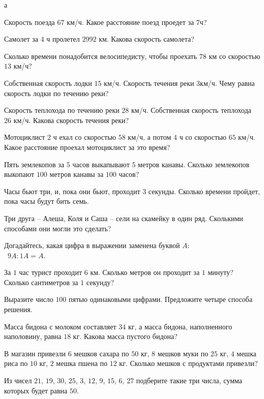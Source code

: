 \begin{exam}
	\begin{listofex}
		\item а
	\end{listofex}
\end{exam}

\begin{consultation}
	\begin{listofex}
		\item Скорость поезда \( 67 \) км/ч. Какое расстояние поезд проедет за \( 7 \)ч?
		\item Самолет за \( 4 \) ч пролетел \( 2992 \) км. Какова скорость самолета?
		\item Сколько времени понадобится велосипедисту, чтобы проехать \( 78 \) км со скоростью \( 13 \) км/ч?
		\item Собственная скорость лодки \( 15 \) км/ч. Скорость течения реки \( 3 \)км/ч. Чему равна скорость лодки по течению реки?
		\item Скорость теплохода по течению реки \( 28 \) км/ч. Собственная скорость теплохода \( 26 \) км/ч. Какова скорость течения реки?
		\item Мотоциклист \( 2 \) ч ехал со скоростью \( 58 \) км/ч, а потом \( 4 \) ч со скоростью \( 65 \) км/ч. Какое расстояние проехал мотоциклист за это время?
		\item Пять землекопов за \( 5 \) часов выкапывают \( 5 \) метров канавы. Сколько землекопов выкопают \( 100 \) метров канавы за \( 100 \) часов?
		\item Часы бьют три, и, пока они бьют, проходит \( 3 \) секунды. Сколько времени пройдет, пока часы будут бить семь.
		\item Три друга – Алеша, Коля и Саша – сели на скамейку в один ряд. Сколькими способами они могли это сделать?
		\item Догадайтесь, какая цифра в выражении заменена буквой \( A \):\\\ \( 9A : 1A = A \).
		\item За \( 1 \) час турист проходит \( 6 \) км. Сколько метров он проходит за \( 1 \) минуту? Сколько сантиметров за \( 1 \) секунду?
		\item Выразите число \( 100 \) пятью одинаковыми цифрами. Предложите четыре способа решения.
		\item Масса бидона с молоком составляет \( 34 \) кг, а масса бидона, наполненного наполовину, равна \( 18 \) кг. Какова масса пустого бидона?
		\item В магазин привезли \( 6 \) мешков сахара по \( 50 \) кг, \( 8 \) мешков муки по \( 25 \) кг, \( 4 \) мешка риса по \( 10  \) кг, \( 2 \) мешка пшена по \( 12 \) кг. Сколько мешков с продуктами привезли? 
		\item Из чисел \( 21 \), \( 19 \), \( 30 \), \( 25 \), \( 3 \), \( 12 \), \( 9 \), \( 15 \), \( 6 \), \( 27  \) подберите такие три числа, сумма которых будет равна \( 50 \).
	\end{listofex}
\end{consultation}
